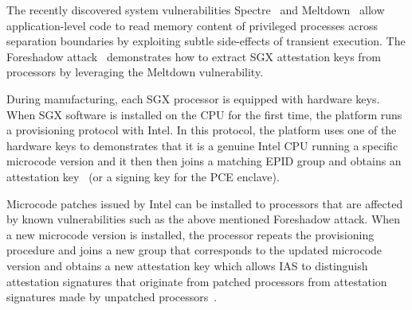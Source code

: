 The recently discovered system vulnerabilities Spectre~\cite{Kocher2018spectre} and Meltdown~\cite{Lipp2018meltdown} allow application-level code to read memory content of privileged processes across separation boundaries by exploiting subtle side-effects of transient execution. The Foreshadow attack~\cite{foreshadow-usenix18} demonstrates how to extract SGX attestation keys from processors by leveraging the Meltdown vulnerability. 

During manufacturing, each SGX processor is equipped with hardware keys. When SGX software is installed on the CPU for the first time, the platform runs a provisioning protocol with Intel. In this protocol, the platform uses one of the hardware keys to demonstrates that it is a genuine Intel CPU running a specific microcode version and it then then joins a matching EPID group and obtains an attestation key~\cite{epid_attestation} (or a signing key for the PCE enclave). 

Microcode patches issued by Intel can be installed to processors that are affected by known vulnerabilities such as the above mentioned Foreshadow attack. When a new microcode version is installed, the processor repeats the provisioning procedure and joins a new group that corresponds to the updated microcode version and obtains a new attestation key which allows IAS to distinguish attestation signatures that originate from patched processors from attestation signatures made by unpatched processors~\cite{epid_attestation}.